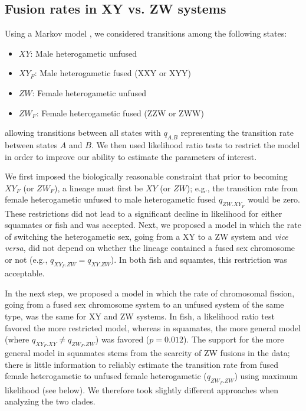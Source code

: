 \subsection{Fusion rates in XY vs. ZW systems}

Using a Markov model \citep{Pagel1994}, we considered transitions among the following states:
\begin{itemize}
\item $XY$: Male heterogametic unfused
\item $XY_F$: Male heterogametic fused (XXY or XYY)
\item $ZW$: Female heterogametic unfused
\item $ZW_F$: Female heterogametic fused (ZZW or ZWW)
\end{itemize}
allowing transitions between all states with $q_{A.B}$ representing the transition rate between states $A$ and $B$. We then used likelihood ratio tests to restrict the model in order to improve our ability to estimate the parameters of interest. 

We first imposed the biologically reasonable constraint that prior to becoming $XY_F$ (or $ZW_F$), a lineage must first be $XY$ (or $ZW$); e.g., the transition rate from female heterogametic unfused to male heterogametic fused $q_{ZW.XY_F}$ would be zero. These restrictions did not lead to a significant decline in likelihood for either squamates or fish and was accepted. Next, we proposed a model in which the rate of switching the heterogametic sex, going from a XY to a ZW system and \emph{vice versa}, did not depend on whether the lineage contained a fused sex chromosome or not (e.g., $q_{XY_F.ZW} = q_{XY.ZW}$). In both fish and squamtes, this restriction was acceptable.

In the next step, we proposed a model in which the rate of chromosomal fission, going from a fused sex chromosome system to an unfused system of the same type, was the same for XY and ZW systems. In fish, a likelihood ratio test favored the more restricted model, whereas in squamates, the more general model (where $q_{XY_F.XY} \neq q_{ZW_F.ZW}$) was favored ($p=\text{0.012}$). The support for the more general model in squamates stems from the scarcity of ZW fusions in the data; there is little information to reliably estimate the transition rate from fused female heterogametic to unfused female heterogametic ($q_{ZW_F.ZW}$) using maximum likelihood (see below). We therefore took slightly different approaches when analyzing the two clades.

